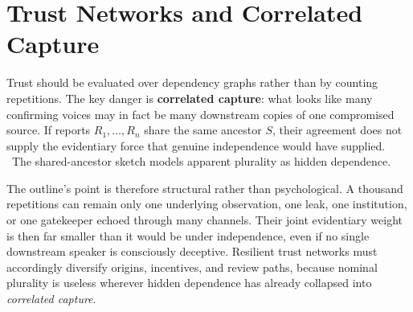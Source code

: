 
\chapter{Trust Networks and Correlated Capture}
\label{ch:ch060}


Trust should be evaluated over dependency graphs rather than by counting repetitions. The key danger is \textbf{correlated capture}: what looks like many confirming voices may in fact be many downstream copies of one compromised source. If reports \(R_1,\ldots,R_n\) share the same ancestor \(S\), their agreement does not supply the evidentiary force that genuine independence would have supplied.
\ToyModel\ The shared-ancestor sketch models apparent plurality as hidden dependence.

The outline's point is therefore structural rather than psychological. A thousand repetitions can remain only one underlying observation, one leak, one institution, or one gatekeeper echoed through many channels. Their joint evidentiary weight is then far smaller than it would be under independence, even if no single downstream speaker is consciously deceptive. Resilient trust networks must accordingly diversify origins, incentives, and review paths, because nominal plurality is useless wherever hidden dependence has already collapsed into \emph{correlated capture}.
